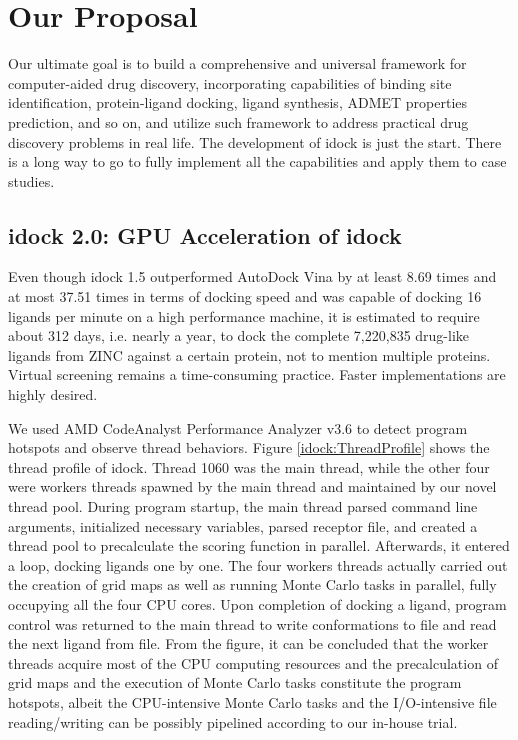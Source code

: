 \chapter{Our Proposal}

Our ultimate goal is to build a comprehensive and universal framework for computer-aided drug discovery, incorporating capabilities of binding site identification, protein-ligand docking, ligand synthesis, ADMET properties prediction, and so on, and utilize such framework to address practical drug discovery problems in real life. The development of idock is just the start. There is a long way to go to fully implement all the capabilities and apply them to case studies.

\section{idock 2.0: GPU Acceleration of idock}

Even though idock 1.5 outperformed AutoDock Vina \citep{595} by at least 8.69 times and at most 37.51 times in terms of docking speed and was capable of docking 16 ligands per minute on a high performance machine, it is estimated to require about 312 days, i.e. nearly a year, to dock the complete 7,220,835 drug-like ligands from ZINC against a certain protein, not to mention multiple proteins. Virtual screening remains a time-consuming practice. Faster implementations are highly desired.

We used AMD CodeAnalyst Performance Analyzer v3.6 to detect program hotspots and observe thread behaviors. Figure \ref{idock:ThreadProfile} shows the thread profile of idock. Thread 1060 was the main thread, while the other four were workers threads spawned by the main thread and maintained by our novel thread pool. During program startup, the main thread parsed command line arguments, initialized necessary variables, parsed receptor file, and created a thread pool to precalculate the scoring function in parallel. Afterwards, it entered a loop, docking ligands one by one. The four workers threads actually carried out the creation of grid maps as well as running Monte Carlo tasks in parallel, fully occupying all the four CPU cores. Upon completion of docking a ligand, program control was returned to the main thread to write conformations to file and read the next ligand from file. From the figure, it can be concluded that the worker threads acquire most of the CPU computing resources and the precalculation of grid maps and the execution of Monte Carlo tasks constitute the program hotspots, albeit the CPU-intensive Monte Carlo tasks and the I/O-intensive file reading/writing can be possibly pipelined according to our in-house trial.

